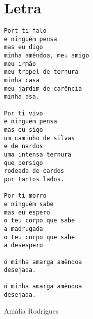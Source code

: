 \documentclass[12pt]{article}
\begin{document}
\maketitle
\section*{Letra}
\begin{center}
\begin{verbatim}
Port ti falo
e ninguém pensa
mas eu digo
minha amêndoa, meu amigo
meu irmão
meu tropel de ternura
minha casa
meu jardim de carência
minha asa.

Por ti vivo
e ninguém pensa
mas eu sigo
um caminho de silvas
e de nardos
uma intensa ternura
que persigo
rodeada de cardos
por tantos lados.

Por ti morro
e ninguém sabe
mas eu espero 
o teu corpo que sabe 
a madrugada
o teu corpo que sabe
a desespero

ó minha amarga amêndoa 
desejada.

ó minha amarga amêndoa
desejada.
\end{verbatim}
\vspace{5mm}
\hfill  Amália Rodrigues
\end{center}
\end{document}
